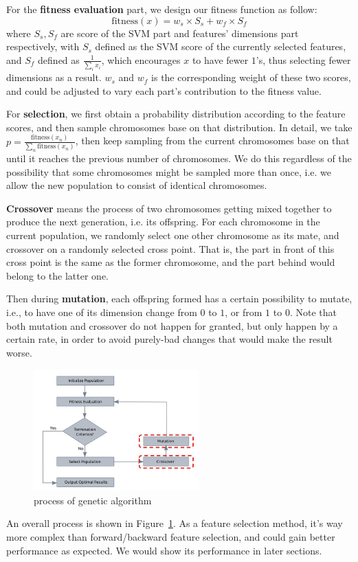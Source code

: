 \documentclass[journal]{IEEEtran}
\begin{document}
For the \textbf{fitness evaluation} part, we design our fitness function as follow:
$$
\mathrm{fitness}(x) = w_s\times S_s + w_f\times S_f
$$
where $S_s, S_f$ are score of the SVM part and features' dimensions part respectively, with $S_s$ defined as the SVM score of the currently selected features, and $S_f$ defined as $\frac{1}{\sum_i x_i}$, which encourages $x$ to have fewer $1$'s, thus selecting fewer dimensions as a result. $w_s$ and $w_f$ is the corresponding weight of these two scores, and could be adjusted to vary each part's contribution to the fitness value.

For \textbf{selection}, we first obtain a probability distribution according to the feature scores, and then sample chromosomes base on that distribution. In detail, we take $p = \frac{\mathrm{fitness}(x_n)}{\sum_n \mathrm{fitness}(x_n)}$, then keep sampling from the current chromosomes base on that until it reaches the previous number of chromosomes. We do this regardless of the possibility that some chromosomes might be sampled more than once, i.e. we allow the new population to consist of identical chromosomes.

\textbf{Crossover} means the process of two chromosomes getting mixed together to produce the next generation, i.e. its offspring. For each chromosome in the current population, we randomly select one other chromosome as its mate, and crossover on a randomly selected cross point. That is, the part in front of this cross point is the same as the former chromosome, and the part behind would belong to the latter one.

Then during \textbf{mutation}, each offspring formed has a certain possibility to mutate, i.e., to have one of its dimension change from $0$ to $1$, or from $1$ to $0$. Note that both mutation and crossover do not happen for granted, but only happen by a certain rate, in order to avoid purely-bad changes that would make the result worse.

\begin{figure}[htpb]
  \centering
  \includegraphics[width=2.5in]{genetic_alg.jpg}
  \caption{process of genetic algorithm}
  \label{fig:1}
  \vspace{-3mm}
\end{figure}
An overall process is shown in Figure~\ref{fig:1}. As a feature selection method, it's way more complex than forward/backward feature selection, and could gain better performance as expected. We would show its performance in later sections. 
\end{document}
